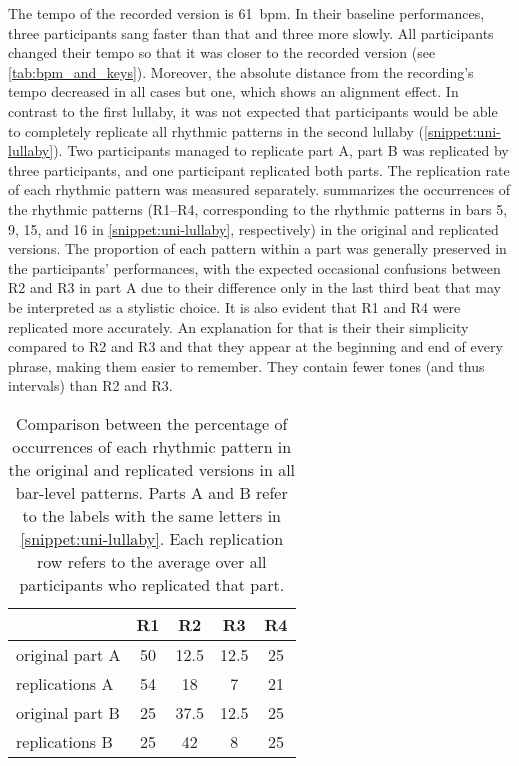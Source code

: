 %
The tempo of the recorded version is \SI{61}{\ac{bpm}}.
In their baseline performances, three participants sang faster than that and three more slowly.
All participants changed their tempo so that it was closer to the recorded version (see \cref{tab:bpm_and_keys}).
Moreover, the absolute distance from the recording's tempo decreased in all cases but one, which shows an alignment effect.
In contrast to the first lullaby, it was not expected that participants would be able to completely replicate all rhythmic patterns in the second lullaby (\cref{snippet:uni-lullaby}).
Two participants managed to replicate part A, part B was replicated by three participants, and one participant replicated both parts.
The replication rate of each rhythmic pattern was measured separately.
 summarizes the occurrences of the rhythmic patterns (R1--R4, corresponding to the rhythmic patterns in bars 5, 9, 15, and 16 in \cref{snippet:uni-lullaby}, respectively) in the original and replicated versions.
The proportion of each pattern within a part was generally preserved in the participants' performances, with the expected occasional confusions between R2 and R3 in part A due to their difference only in the last third beat that may be interpreted as a stylistic choice.
It is also evident that R1 and R4 were replicated more accurately.
An explanation for that is their their simplicity compared to R2 and R3 and that they appear at the beginning and end of every phrase, making them easier to remember.
They contain fewer tones (and thus intervals) than R2 and R3.
%
\begin{table}
	\caption[Percentages of rhythmic pattern replications]
		{Comparison between the percentage of occurrences of each rhythmic pattern in the original and replicated versions in all bar-level patterns.
		Parts A and B refer to the labels with the same letters in \cref{snippet:uni-lullaby}.
		Each replication row refers to the average over all participants who replicated that part.}
	\label{tab:neutral_rhythm_key}  
	\centering
	\begin{tabularx}{\linewidth}{XSSSS}
		\toprule
						& \bfseries{R1}		& \bfseries{R2}		& \bfseries{R3}		& \bfseries{R4}\\
		\midrule
		original part A	& 50				& 12.5				& 12.5				& 25\\
		replications A	& 54				& 18				& 7					& 21\\
		\rule{0pt}{0.5cm}%
		original part B	& 25				& 37.5				& 12.5				& 25\\
		replications B	& 25				& 42				& 8					& 25\\		
		\bottomrule
	\end{tabularx}
\end{table}
%



